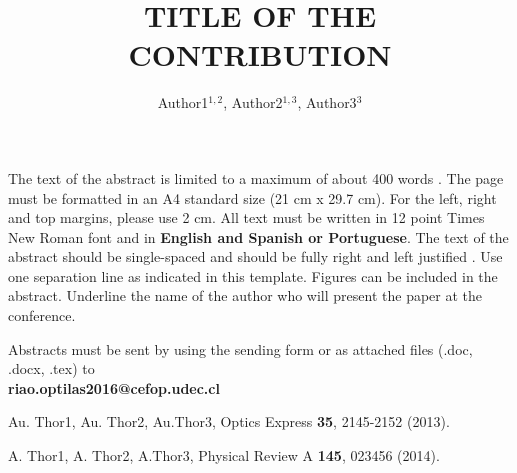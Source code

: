 \documentclass{./RiaoOptilas2016}
\begin{document}

\title{TITLE OF THE CONTRIBUTION}


\author{Author1$^{1,2}$, Author2$^{1,3}$, Author3$^{3}$}
\bigskip

\address{
$^1$Departamento de F\'{\i}sica, Universidad de Concepci\'{o}n, Casilla 146, Concepci\'{o}n Chile\\
\bigskip
$^2$Departamento de F\'{\i}sica, Universidad de Sevilla, Casilla 120, Sevila, Espaï¿½a\\
\bigskip
$^3$Departamento de F\'{\i}sica, Universidad de Buenos Aires, Casilla 190, Buenos Aires, Argentina}




The text of the abstract is limited to a maximum of about 400 words \cite{Author82}. The page must be formatted in an A4 standard size (21 cm x 29.7 cm). For the left, right and top margins, please use 2 cm. All text must be written in 12 point Times New Roman font and in \textbf{English and Spanish or Portuguese}. The text of the abstract should be single-spaced and should be fully right and left justified \cite{Author96}. Use one separation line as indicated in this template. Figures can be included in the abstract. Underline the name of the author who will present the paper at the conference.

\bigskip

Abstracts must be sent by using the sending form or as attached files (.doc, .docx, .tex) to \\ \textbf{riao.optilas2016@cefop.udec.cl}




\begin{thebibliography}{99}

 Au. Thor1, Au. Thor2, Au.Thor3, Optics Express \textbf{35}, 2145-2152 (2013).

 A. Thor1, A. Thor2, A.Thor3, Physical Review A \textbf{145}, 023456 (2014).

\end{thebibliography}
\end{document}
